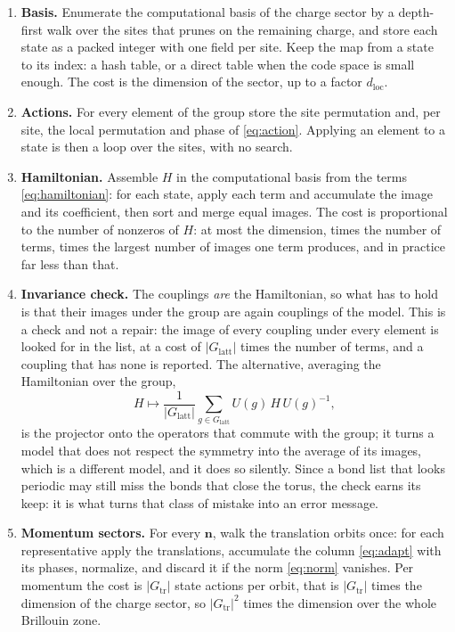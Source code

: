 \documentclass[12pt]{article}
\newcommand{\Glatt}{G_{\mathrm{latt}}}
\newcommand{\Gtr}{G_{\mathrm{tr}}}
\begin{document}
\begin{enumerate}
\item \textbf{Basis.} Enumerate the computational basis of the charge sector by a
depth-first walk over the sites that prunes on the remaining charge, and store
each state as a packed integer with one field per site. Keep the map from a state
to its index: a hash table, or a direct table when the code space is small enough.
The cost is the dimension of the sector, up to a factor $d_{\mathrm{loc}}$.

\item \textbf{Actions.} For every element of the group store the site permutation
and, per site, the local permutation and phase of \eqref{eq:action}. Applying an
element to a state is then a loop over the sites, with no search.

\item \textbf{Hamiltonian.} Assemble $H$ in the computational basis from the terms
\eqref{eq:hamiltonian}: for each state, apply each term and accumulate the image
and its coefficient, then sort and merge equal images. The cost is proportional
to the number of nonzeros of $H$: at most the dimension, times the number of
terms, times the largest number of images one term produces, and in practice far
less than that.

\item \textbf{Invariance check.} The couplings \emph{are} the Hamiltonian, so
what has to hold is that their images under the group are again couplings of the
model. This is a check and not a repair: the image of every coupling under every
element is looked for in the list, at a cost of $|\Glatt|$ times the number of
terms, and a coupling that has none is reported. The alternative, averaging the
Hamiltonian over the group,
\begin{equation}
  H \mapsto \frac{1}{|\Glatt|}\sum_{g\in\Glatt} U(g)\,H\,U(g)^{-1},
  \label{eq:sym}
\end{equation}
is the projector onto the operators that commute with the group; it turns a model
that does not respect the symmetry into the average of its images, which is a
different model, and it does so silently. Since a bond list that looks periodic
may still miss the bonds that close the torus, the check earns its keep: it is
what turns that class of mistake into an error message.

\item \textbf{Momentum sectors.} For every $\mathbf{n}$, walk the translation
orbits once: for each representative apply the translations, accumulate the
column \eqref{eq:adapt} with its phases, normalize, and discard it if the norm
\eqref{eq:norm} vanishes. Per momentum the cost is $|\Gtr|$ state actions per
orbit, that is $|\Gtr|$ times the dimension of the charge sector, so $|\Gtr|^{2}$
times the dimension over the whole Brillouin zone.


\end{enumerate}
\end{document}
